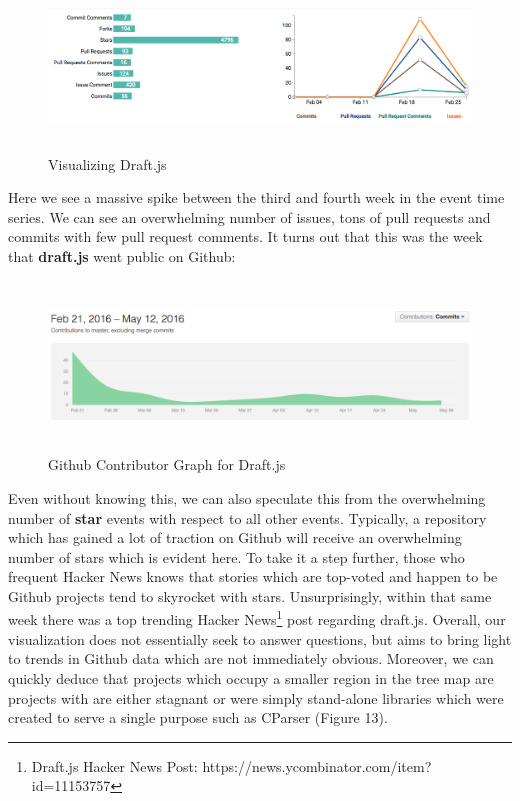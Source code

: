 \documentclass{article}
\begin{document}
\begin{figure}[h!]
\centering
\includegraphics[height=4.5cm, width=17cm]{draft}
\caption{Visualizing Draft.js}
\end{figure}

Here we see a massive spike between the third and fourth week in the event time series. We can see an overwhelming number of issues, tons of pull requests and commits with few pull request comments. It turns out that this was the week that \textbf{draft.js} went public on Github:

\begin{figure}[h!]
\centering
\includegraphics[height=4.5cm, width=17cm]{graph}
\caption{Github Contributor Graph for Draft.js}
\end{figure}

Even without knowing this, we can also speculate this from the overwhelming number of \textbf{star} events with respect to all other events. Typically, a repository which has gained a lot of traction on Github will receive an overwhelming number of stars which is evident here. To take it a step further, those who frequent Hacker News knows that stories which are top-voted and happen to be Github projects tend to skyrocket with stars. Unsurprisingly, within that same week there was a top trending Hacker News\footnote{Draft.js Hacker News Post: https://news.ycombinator.com/item?id=11153757} post regarding draft.js. Overall, our visualization does not essentially seek to answer questions, but aims to bring light to trends in Github data which are not immediately obvious. Moreover, we can quickly deduce that projects which occupy a smaller region in the tree map are projects with are either stagnant or were simply stand-alone libraries which were created to serve a single purpose such as CParser (Figure 13). 
\end{document}
